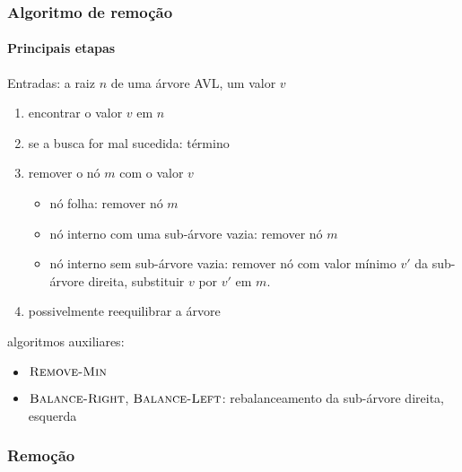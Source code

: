 \documentclass{beamer}
\begin{document}
\begin{frame}

\frametitle{Algoritmo de remoção}
\framesubtitle{Principais etapas}

Entradas: a raiz $n$ de uma árvore AVL, um valor $v$

\begin{enumerate}
\item encontrar o valor $v$ em $n$
\item se a busca for mal sucedida: término
\item remover o nó $m$ com o valor $v$
\begin{itemize}
\item nó folha: remover nó $m$
\item nó interno com uma sub-árvore vazia: remover nó $m$
\item nó interno sem sub-árvore vazia: remover nó com valor mínimo $v'$ da sub-árvore direita, substituir $v$ por $v'$ em $m$.
\end{itemize}
\item possivelmente reequilibrar a árvore
\end{enumerate}
\pause
algoritmos auxiliares:
\begin{itemize}
\item $\textnormal{\scshape Remove-Min}$
\item $\textnormal{\scshape Balance-Right}$, $\textnormal{\scshape Balance-Left}$: rebalanceamento da sub-árvore direita, esquerda
\end{itemize}
\end{frame}

\begin{frame}
\frametitle{Remoção}

\begin{small}
\end{small}

\end{frame}
\end{document}
